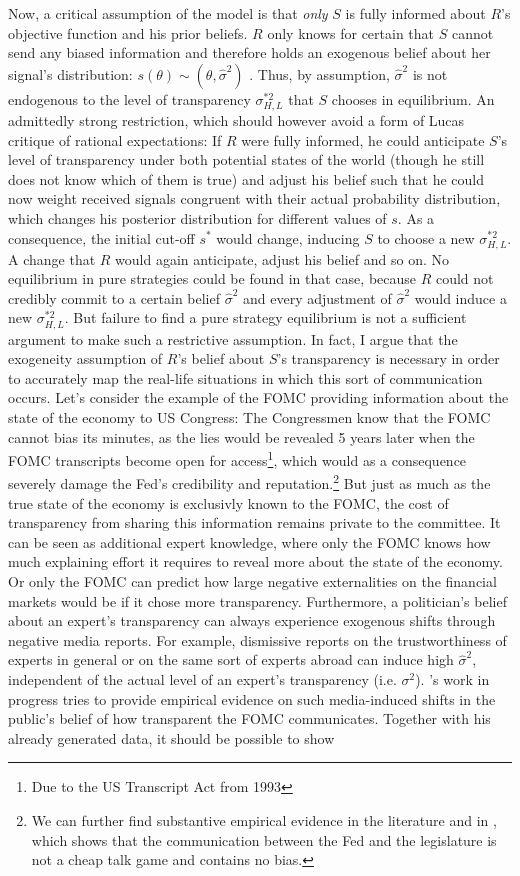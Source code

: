 \documentclass[paper=a4,12pt,DIV=11,twoside=false]{scrartcl}
\begin{document}
\noindent Now, a critical assumption of the model is that \textit{only} $S$ is fully informed about $R$'s objective function and his prior beliefs. $R$ only knows for certain that $S$ cannot send any biased information and therefore holds an exogenous belief about her signal's distribution: $s(\theta)\sim(\theta, \hat{\sigma}^2)$ . Thus, by assumption, $\hat{\sigma}^2$ is not endogenous to the level of transparency $\sigma^{*2}_{H,L}$ that $S$ chooses in equilibrium. An admittedly strong restriction, which should however avoid a form of Lucas critique of rational expectations: If $R$ were fully informed, he could anticipate $S$'s level of transparency under both potential states of the world (though he still does not know which of them is true) and adjust his belief such that he could now weight received signals congruent with their actual probability distribution, which changes his posterior distribution for different values of $s$. As a consequence, the initial cut-off $s^{*}$ would change, inducing $S$ to choose a new $\sigma^{*2}_{H,L}$. A change that $R$ would again anticipate, adjust his belief and so on. No equilibrium in pure strategies could be found in that case, because $R$ could not credibly commit to a certain belief $\hat{\sigma}^2$ and every adjustment of $\hat{\sigma}^2$ would induce a new $\sigma^{*2}_{H,L}$. But failure to find a pure strategy equilibrium is not a sufficient argument to make such a restrictive assumption. In fact, I argue that the exogeneity assumption of $R$'s belief about $S$'s transparency is necessary in order to accurately map the real-life situations in which this sort of communication occurs. Let's consider the example of the FOMC providing information about the state of the economy to US Congress: The Congressmen know that the FOMC cannot bias its minutes, as the lies would be revealed 5 years later when the FOMC transcripts become open for access\footnote{Due to the US Transcript Act from 1993}, which would as a consequence severely damage the Fed's credibility and reputation.\footnote{We can further find substantive empirical evidence in the literature and in \citet{GL2017}, which shows that the communication between the Fed and the legislature is not a cheap talk game and contains no bias.} But just as much as the true state of the economy is exclusivly known to the FOMC, the cost of transparency from sharing this information remains private to the committee. It can be seen as additional expert knowledge, where only the FOMC knows how much explaining effort it requires to reveal more about the state of the economy. Or only the FOMC can predict how large negative externalities on the financial markets would be if it chose more transparency. Furthermore, a politician's belief about an expert's transparency can always experience exogenous shifts through negative media reports. For example, dismissive reports on the trustworthiness of experts in general or on the same sort of experts abroad can induce high $\hat{\sigma}^2$, independent of the actual level of an expert's transparency (i.e. $\sigma^2$). \citet{GL2017}'s work in progress tries to provide empirical evidence on such media-induced shifts in the public's belief of how transparent the FOMC communicates. Together with his already generated data, it should be possible to show 
\end{document}

